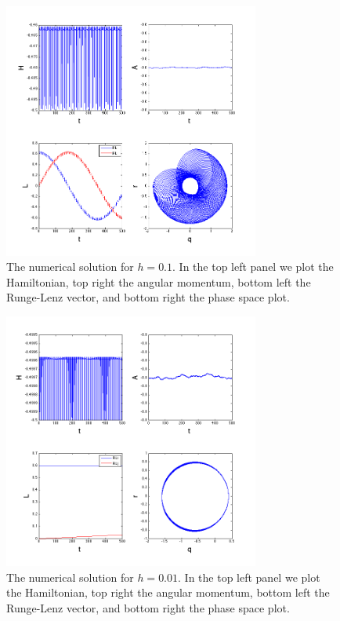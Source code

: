 \documentclass[11pt]{article}
\begin{document}
\begin{figure}[h!]
  \centering
  \includegraphics[width=0.75\textwidth]{code/MATLAB/andy_hw12_01.png}
  \caption{The numerical solution for $h=0.1$.
  In the top left panel we plot the Hamiltonian, top right the angular momentum, bottom left the Runge-Lenz vector, and bottom right the phase space plot.}
\end{figure}

\begin{figure}[h!]
  \centering
  \includegraphics[width=0.75\textwidth]{code/MATLAB/andy_hw12_02.png}
  \caption{The numerical solution for $h=0.01$.
  In the top left panel we plot the Hamiltonian, top right the angular momentum, bottom left the Runge-Lenz vector, and bottom right the phase space plot.}
\end{figure}
\end{document}
